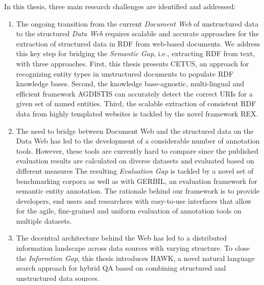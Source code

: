 In this thesis, three main research challenges are identified and addressed:
\begin{enumerate}
\item 
The ongoing transition from the current \emph{Document Web} of unstructured data to the structured \emph{Data Web} requires scalable and accurate approaches for the extraction of structured data in \ac{RDF} from web-based documents.
We address this key step for bridging the \emph{Semantic Gap}, i.e., extracting RDF from text, with three approaches.
First, this thesis presents CETUS, an approach for recognizing entity types in unstructured documents to populate RDF knowledge bases. 
Second, the knowledge base-agnostic, multi-lingual and efficient framework AGDISTIS can accurately detect the correct URIs for a given set of named entities.
Third, the scalable extraction of consistent \ac{RDF} data from highly templated websites is tackled by the novel framework REX.
\item 
The need to bridge between Document Web and the structured data on the Data Web has led to the development of a considerable number of annotation tools. 
However, these tools are currently hard to compare since the published evaluation results are calculated on diverse datasets and evaluated based on different measures
The resulting \emph{Evaluation Gap} is tackled by a novel set of benchmarking corpora as well as with GERBIL, an evaluation framework for semantic entity annotation. 
The rationale behind our framework is to provide developers, end users and researchers with easy-to-use interfaces that allow for the agile, fine-grained and uniform evaluation of annotation tools on multiple datasets.
\item 
The decentral architecture behind the Web has led to a distributed information landscape across data sources with varying structure. 
To close the \emph{Informtion Gap},  this thesis introduces HAWK, a novel natural language search approach for hybrid \ac{QA} based on combining structured and unstructured data sources.
\end{enumerate}

